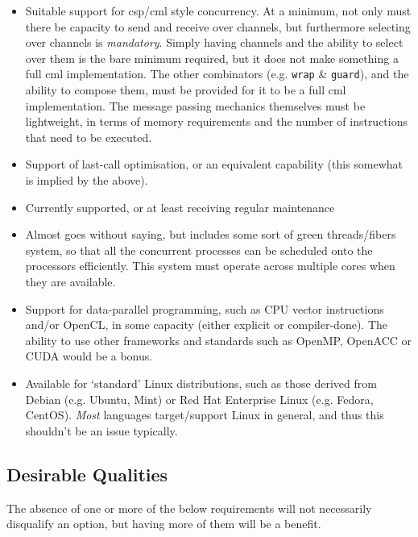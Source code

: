 \begin{itemize}
    \item Suitable support for \gls{csp}/\gls{cml} style concurrency.  At a minimum, not only must there be capacity to send and receive over channels, but furthermore selecting over channels is \emph{mandatory}.  Simply having channels and the ability to select over them is the bare minimum required, but it does not make something a full \gls{cml} implementation.  The other combinators (e.g. \texttt{wrap} \& \texttt{guard}), and the ability to compose them, must be provided for it to be a full \gls{cml} implementation.  The message passing mechanics themselves must be lightweight, in terms of memory requirements and the number of instructions that need to be executed.
    \item Support of last-call optimisation, or an equivalent capability (this somewhat is implied by the above).
    \item Currently supported, or at least receiving regular maintenance
    \item Almost goes without saying, but includes some sort of green threads/fibers system, so that all the concurrent processes can be scheduled onto the processors efficiently.  This system must operate across multiple cores when they are available.
    \item Support for data-parallel programming, such as CPU vector instructions and/or OpenCL, in some capacity (either explicit or compiler-done).  The ability to use other frameworks and standards such as OpenMP, OpenACC or CUDA would be a bonus.
    \item Available for `standard' Linux distributions, such as those derived from Debian (e.g. Ubuntu, Mint) or Red Hat Enterprise Linux (e.g. Fedora, CentOS).  \emph{Most} languages target/support Linux in general, and thus this shouldn't be an issue typically.
\end{itemize}

\subsection{Desirable Qualities}
The absence of one or more of the below requirements will not necessarily disqualify an option, but having more of them will be a benefit.

